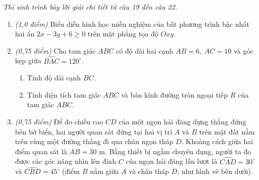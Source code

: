 \documentclass[12pt,a4paper]{article}
\newcommand{\parttitle}[1]{\par\vspace{2pt}{\large\bfseries\color{ink}#1}\par\vspace{1pt}}
\begin{document}
\parttitle{PHẦN IV. Tự luận}
\textit{Thí sinh trình bày lời giải chi tiết từ câu 19 đến câu 22.}
\begin{enumerate}[resume]
\item \textit{(1,0 điểm)} Biểu diễn hình học miền nghiệm của bất phương trình bậc nhất hai ẩn $2x - 3y + 6 \ge 0$ trên mặt phẳng tọa độ $Oxy$.

\item \textit{(0,75 điểm)} Cho tam giác $ABC$ có độ dài hai cạnh $AB = 6,\; AC = 10$ và góc kẹp giữa $\widehat{BAC} = 120^\circ$.
\begin{enumerate}
    \item Tính độ dài cạnh $BC$.
    \item Tính diện tích tam giác $ABC$ và bán kính đường tròn ngoại tiếp $R$ của tam giác $ABC$.
\end{enumerate}

\item \textit{(0,75 điểm)} Để đo chiều cao $CD$ của một ngọn hải đăng dựng thẳng đứng bên bờ biển, hai người quan sát đứng tại hai vị trí $A$ và $B$ trên mặt đất nằm trên cùng một đường thẳng đi qua chân ngọn tháp $D$. Khoảng cách giữa hai điểm quan sát là $AB = 30\text{ m}$. Bằng thiết bị ngắm chuyên dụng, người ta đo được các góc nâng nhìn lên đỉnh $C$ của ngọn hải đăng lần lượt là $\widehat{CAD} = 30^\circ$ và $\widehat{CBD} = 45^\circ$ (điểm $B$ nằm giữa $A$ và chân tháp $D$, như hình vẽ bên dưới).

\begin{center}
\end{center}
\end{enumerate}
\end{document}

